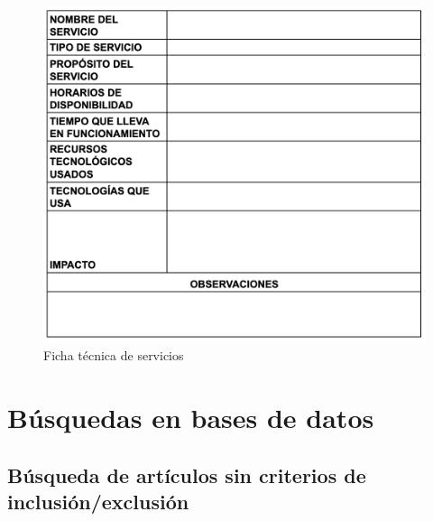 \begin{figure}[htbp]
    \centering
    \includegraphics[width=\textwidth,height=0.85\textheight,keepaspectratio]{apendices/caracterizacionServicios.png}
    \caption{Ficha técnica de servicios}\label{fig:tabla-ficha-servicios}
\end{figure}
\FloatBarrier\clearpage

\chapter{Búsquedas en bases de datos}
\section*{Búsqueda de artículos sin criterios de inclusión/exclusión}

